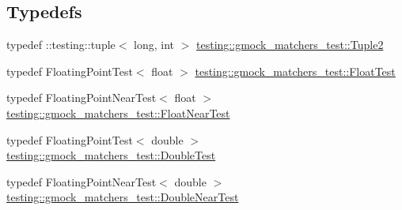 \subsection*{Typedefs}
\begin{DoxyCompactItemize}
\item 
typedef \+::testing\+::tuple$<$ long, int $>$ \mbox{\hyperlink{namespacetesting_1_1gmock__matchers__test_a8b82c859cd28da9e7f7d4c6091a3165c}{testing\+::gmock\+\_\+matchers\+\_\+test\+::\+Tuple2}}
\item 
typedef Floating\+Point\+Test$<$ float $>$ \mbox{\hyperlink{namespacetesting_1_1gmock__matchers__test_a145329e433869625f9f0e98a0cdfd7b4}{testing\+::gmock\+\_\+matchers\+\_\+test\+::\+Float\+Test}}
\item 
typedef Floating\+Point\+Near\+Test$<$ float $>$ \mbox{\hyperlink{namespacetesting_1_1gmock__matchers__test_a426b51f464dcb48033946e1bf3cc8795}{testing\+::gmock\+\_\+matchers\+\_\+test\+::\+Float\+Near\+Test}}
\item 
typedef Floating\+Point\+Test$<$ double $>$ \mbox{\hyperlink{namespacetesting_1_1gmock__matchers__test_a944cdd366ed240f29ae8e3ebc753ad5c}{testing\+::gmock\+\_\+matchers\+\_\+test\+::\+Double\+Test}}
\item 
typedef Floating\+Point\+Near\+Test$<$ double $>$ \mbox{\hyperlink{namespacetesting_1_1gmock__matchers__test_aea537d0183ccc65b5c49a75d711993c8}{testing\+::gmock\+\_\+matchers\+\_\+test\+::\+Double\+Near\+Test}}
\end{DoxyCompactItemize}
